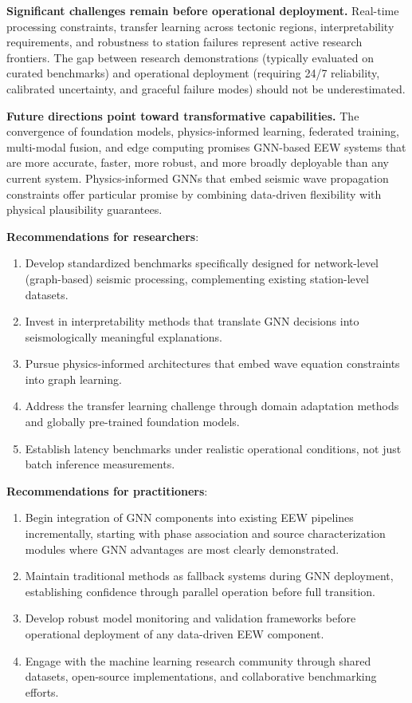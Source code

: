 \documentclass[review,authoryear]{elsarticle}
\begin{document}
\textbf{Significant challenges remain before operational deployment.} Real-time processing constraints, transfer learning across tectonic regions, interpretability requirements, and robustness to station failures represent active research frontiers. The gap between research demonstrations (typically evaluated on curated benchmarks) and operational deployment (requiring 24/7 reliability, calibrated uncertainty, and graceful failure modes) should not be underestimated.

\textbf{Future directions point toward transformative capabilities.} The convergence of foundation models, physics-informed learning, federated training, multi-modal fusion, and edge computing promises GNN-based EEW systems that are more accurate, faster, more robust, and more broadly deployable than any current system. Physics-informed GNNs that embed seismic wave propagation constraints offer particular promise by combining data-driven flexibility with physical plausibility guarantees.

\textbf{Recommendations for researchers}:
\begin{enumerate}
  \item Develop standardized benchmarks specifically designed for network-level (graph-based) seismic processing, complementing existing station-level datasets.
  \item Invest in interpretability methods that translate GNN decisions into seismologically meaningful explanations.
  \item Pursue physics-informed architectures that embed wave equation constraints into graph learning.
  \item Address the transfer learning challenge through domain adaptation methods and globally pre-trained foundation models.
  \item Establish latency benchmarks under realistic operational conditions, not just batch inference measurements.
\end{enumerate}

\textbf{Recommendations for practitioners}:
\begin{enumerate}
  \item Begin integration of GNN components into existing EEW pipelines incrementally, starting with phase association and source characterization modules where GNN advantages are most clearly demonstrated.
  \item Maintain traditional methods as fallback systems during GNN deployment, establishing confidence through parallel operation before full transition.
  \item Develop robust model monitoring and validation frameworks before operational deployment of any data-driven EEW component.
  \item Engage with the machine learning research community through shared datasets, open-source implementations, and collaborative benchmarking efforts.
\end{enumerate}
\end{document}
